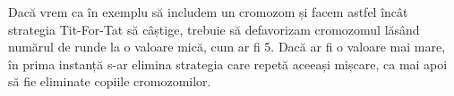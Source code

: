 Dacă vrem ca în exemplu să includem un cromozom și facem astfel încât strategia Tit-For-Tat să câștige, trebuie să defavorizam cromozomul lăsând numărul de runde la o valoare mică, cum ar fi 5. Dacă ar fi o valoare mai mare, în prima instanță s-ar elimina strategia care repetă aceeași mișcare, ca mai apoi să fie eliminate copiile cromozomilor. 










































































































